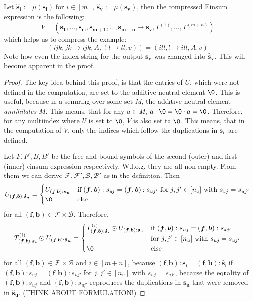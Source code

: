 \begin{theorem}
    Let $\bm{\hat{s}_i} := \mu(\bm{s_i})$ for $i \in [m]$, $\bm{\hat{s}_v} := \mu(\bm{s_v})$, then the compressed Einsum expression is the following:
    $$V = (\bm{\hat{s}_1},\dots,\bm{\hat{s}_m}, \bm{s_{m + 1}}, \dots, \bm{s_{m + n}} \rightarrow \bm{\hat{s}_v}, T^{(1)},\dots,T^{(m + n)})$$
    which helps us to compress the example:
    $$(ijk, jk \rightarrow ijk, A, (l \rightarrow ll, v)) = (ill, l \rightarrow ill, A, v)$$
    Note how even the index string for the output $\bm{s_v}$ was changed into $\bm{\hat{s}_v}$.
    This will become apparent in the proof.
\end{theorem}

\begin{proof}
    \small
    The key idea behind this proof, is that the entries of $U$, which were not defined in the computation, are set to the additive neutral element $\0$.
    This is useful, because in a semiring over some set $M$, the additive neutral element \textit{annihilates} $M$.
    This means, that for any $a \in M$, $a \cdot \0 = \0 \cdot a = \0$.
    Therefore, for any multiindex where $U$ is set to $\0$, $V$ is also set to $\0$.
    This means, that in the computation of $V$, only the indices which follow the duplications in $\bm{s_u}$ are defined.

    Let $F, F', B, B'$ be the free and bound symbols of the second (outer) and first (inner) einsum expression respectively.
    W.l.o.g. they are all non-empty.
    From them we can derive $\mathcal{F}, \mathcal{F}', \mathcal{B}, \mathcal{B}'$ as in the definition.
    Then
    $$U_{(\bm{f}, \bm{b}): \bm{\hat{s}_u}} = \begin{cases}
            U_{(\bm{f}, \bm{b}): \bm{s_u}} & \text{if } (\bm{f}, \bm{b}):s_{uj} = (\bm{f}, \bm{b}):s_{uj'} \text{ for } j,j' \in [n_u] \text{ with } s_{uj} = s_{uj'} \\
            \0                             & \text{else}
        \end{cases}$$
    for all $(\bm{f}, \bm{b}) \in \mathcal{F} \times \mathcal{B}$.
    Therefore,
    $$T^{(i)}_{(\bm{f}, \bm{b}): \bm{s_i}} \odot U_{(\bm{f}, \bm{b}): \bm{\hat{s}_u}} = \begin{cases}
            T^{(i)}_{(\bm{f}, \bm{b}): \bm{\hat{s}_i}} \odot U_{(\bm{f}, \bm{b}): \bm{s_u}} & \text{if } (\bm{f}, \bm{b}):s_{uj} = (\bm{f}, \bm{b}):s_{uj'} \\
                                                                                            & \text{for } j,j' \in [n_u] \text{ with } s_{uj} = s_{uj'}     \\
            \0                                                                              & \text{else}
        \end{cases}$$
    for all $(\bm{f}, \bm{b}) \in \mathcal{F} \times \mathcal{B}$ and $i \in [m + n]$,
    because $(\bm{f}, \bm{b}): \bm{s_i} = (\bm{f}, \bm{b}): \bm{\hat{s}_i}$ if $(\bm{f}, \bm{b}):s_{uj} = (\bm{f}, \bm{b}):s_{uj'}$ for $j,j' \in [n_u]$ with $s_{uj} = s_{uj'}$,
    because the equality of $(\bm{f}, \bm{b}):s_{uj}$ and $(\bm{f}, \bm{b}):s_{uj'}$ reproduces the duplications in $\bm{s_u}$ that were removed in $\bm{\hat{s}_u}$.
    (THINK ABOUT FORMULATION!)


\end{proof}
